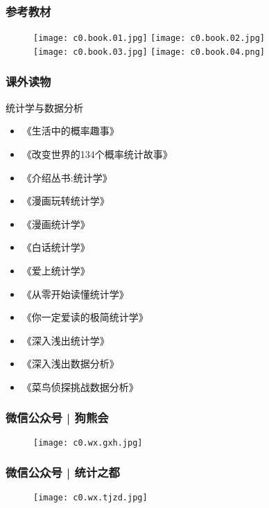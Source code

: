 \begin{frame}
  \frametitle{参考教材}
  \begin{figure}
    \centering
    \texttt{[image: c0.book.01.jpg]}\qquad
    \texttt{[image: c0.book.02.jpg]}\\
    \texttt{[image: c0.book.03.jpg]}\qquad
    \texttt{[image: c0.book.04.png]}
  \end{figure}
\end{frame}

\begin{frame}
  \frametitle{课外读物}
    \begin{block}{统计学与数据分析}
      \begin{multicols}{2}
      \begin{itemize}
         \item 《生活中的概率趣事》
         \item 《改变世界的134个概率统计故事》
         \item 《介绍丛书:统计学》
         \item 《漫画玩转统计学》
         \item 《漫画统计学》
         \item 《白话统计学》
         \item 《爱上统计学》
         \item 《从零开始读懂统计学》
         \item 《你一定爱读的极简统计学》
         \item 《深入浅出统计学》
         \item 《深入浅出数据分析》
         \item 《菜鸟侦探挑战数据分析》
        \end{itemize}
      \end{multicols}
    \end{block}
\end{frame}

\begin{frame}
  \frametitle{微信公众号 | 狗熊会}
  \begin{figure}
    \centering
    \texttt{[image: c0.wx.gxh.jpg]}
  \end{figure}
\end{frame}

\begin{frame}
  \frametitle{微信公众号 | 统计之都}
  \begin{figure}
    \centering
    \texttt{[image: c0.wx.tjzd.jpg]}
  \end{figure}
\end{frame}

